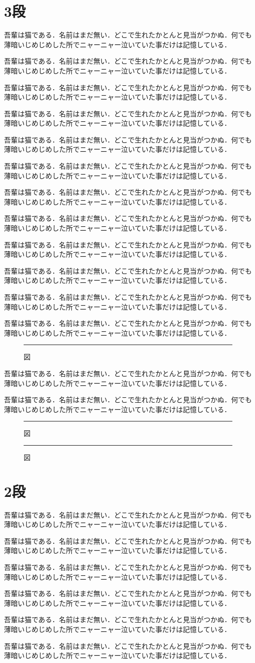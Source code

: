 \documentclass[twocolumn,fontsize=10pt]{jlreq}
\newcommand\para{吾輩は猫である．名前はまだ無い．どこで生れたかとんと見当がつかぬ．何でも薄暗いじめじめした所でニャーニャー泣いていた事だけは記憶している．\par}
\newcommand\fig[1]{\begin{figure}[t]\centering\rule{.6\columnwidth}{#1}\caption{図}\end{figure}}
\begin{document}
\section{3段}
\para\para\para\para\para\para\para\para\para\para\para\para
\fig{60pt}
\para\para
\fig{90pt}\fig{70pt}
\section{2段}
\para\para\para\para\para\para
\end{document}
